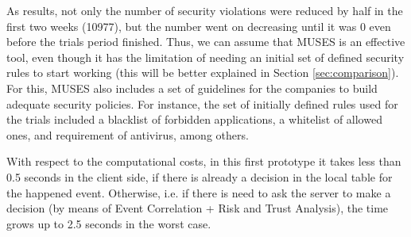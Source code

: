 As results, not only the number of security violations were reduced by half in the first two weeks (10977), but the number went on decreasing until it was 0 even before the trials period finished. Thus, we can assume that MUSES is an effective tool, even though it has the limitation of needing an initial set of defined security rules to start working (this will be better explained in Section \ref{sec:comparison}). For this, MUSES also includes a set of guidelines for the companies to build adequate security policies. For instance, the set of initially defined rules used for the trials included a blacklist of forbidden applications, a whitelist of allowed ones, and requirement of antivirus, among others.

With respect to the computational costs, in this first prototype it takes less than 0.5 seconds in the client side, if there is already a decision in the local table for the happened event. Otherwise, i.e. if there is need to ask the server to make a decision (by means of Event Correlation + Risk and Trust Analysis), the time grows up to 2.5 seconds in the worst case.